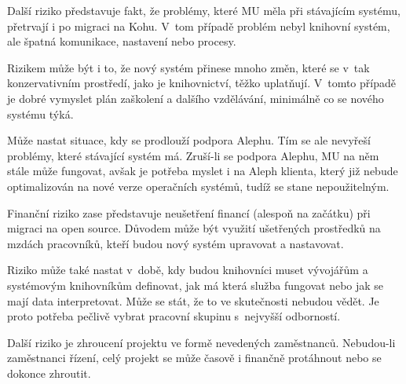 \documentclass[
	11pt, oneside, printed, draft, 
	table,   %
	lof,     %
	lot     %
]{fithesis3}
\begin{document}
{Další riziko představuje fakt, že problémy, které MU měla při stávajícím systému, přetrvají i po migraci na Kohu. V~tom případě problém nebyl knihovní systém, ale špatná komunikace, nastavení nebo procesy.

Rizikem může být i to, že nový systém přinese mnoho změn, které se v~tak konzervativním prostředí, jako je knihovnictví, těžko uplatňují. V~tomto případě je dobré vymyslet plán zaškolení a dalšího vzdělávání, minimálně co se nového systému týká.

Může nastat situace, kdy se prodlouží podpora Alephu. Tím se ale nevyřeší problémy, které stávající systém má. Zruší-li se podpora Alephu, MU na něm stále může fungovat, avšak je potřeba myslet i na Aleph klienta, který již nebude optimalizován na nové verze operačních systémů, tudíž se stane nepoužitelným.

Finanční riziko zase představuje neušetření financí (alespoň na začátku) při migraci na open source. Důvodem může být využití ušetřených prostředků na mzdách pracovníků, kteří budou nový systém upravovat a nastavovat. 

Riziko může také nastat v~době, kdy budou knihovníci muset vývojářům a systémovým knihovníkům definovat, jak má která služba fungovat nebo jak se mají data interpretovat. Může se stát, že to ve skutečnosti nebudou vědět. Je proto potřeba pečlivě vybrat pracovní skupinu s~nejvyšší odborností.

Další riziko je zhroucení projektu ve formě nevedených zaměstnanců. Nebudou-li zaměstnanci řízení, celý projekt se může časově i finančně protáhnout nebo se dokonce zhroutit.

}
\end{document}
